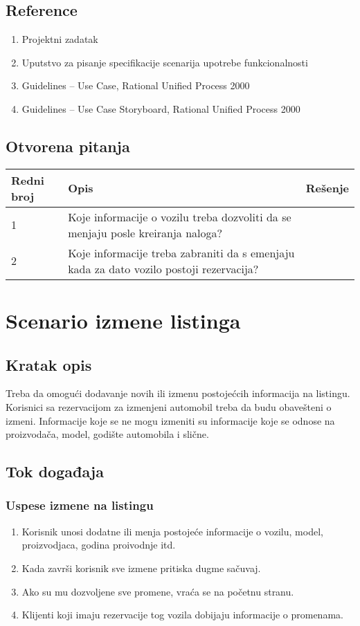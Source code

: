 \documentclass[12pt]{article}
\begin{document}
\subsection{Reference}
\begin{enumerate}
   \item Projektni zadatak
   \item Uputstvo za pisanje specifikacije scenarija upotrebe funkcionalnosti
   \item  Guidelines – Use Case, Rational Unified Process 2000
   \item  Guidelines – Use Case Storyboard, Rational Unified Process 2000
 \end{enumerate}
\subsection{Otvorena pitanja}


\begin{center}
\begin{tabular}{ | m{2cm} | m{7cm}| m{7cm} | } 
\hline
Redni broj& Opis & Rešenje \\ 
\hline
1 & Koje informacije o vozilu treba dozvoliti da se menjaju posle kreiranja naloga? & \\
\hline
2 & Koje informacije treba zabraniti da s emenjaju kada za dato vozilo postoji rezervacija? & \\
\hline
\end{tabular}
\end{center}

    

\section{Scenario izmene listinga}
\subsection{Kratak opis}
Treba da omogući dodavanje novih ili izmenu postojećcih informacija na listingu.
Korisnici sa rezervacijom za izmenjeni automobil treba da budu obavešteni o izmeni.
Informacije koje se ne mogu izmeniti su informacije koje se odnose na proizvodača,
model, godište automobila i slične.
\subsection{Tok događaja}

\subsubsection{Uspese izmene na listingu}
\begin{enumerate}
    \item Korisnik unosi dodatne ili menja postojeće informacije o vozilu, model, proizvodjaca, godina proivodnje itd.
    \item Kada završi korisnik sve izmene pritiska dugme sačuvaj.
    \item Ako su mu dozvoljene sve promene, vraća se na početnu stranu.
    \item Klijenti koji imaju rezervacije tog vozila dobijaju informacije o promenama.
\end{enumerate}
\end{document}
